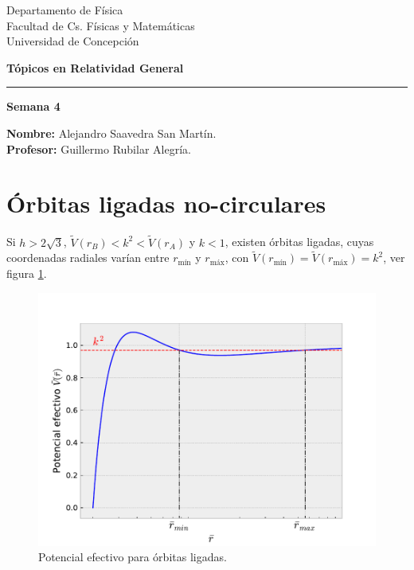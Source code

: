 \documentclass[letterpaper,11pt]{article}
\begin{document}
\pagestyle{plain}

\begin{flushleft}\vspace{-2cm}
Departamento de Física \\
Facultad de Cs. Físicas y Matemáticas\\
Universidad de Concepción
\end{flushleft}

\begin{flushright}\vspace{-1.5cm}
\textbf{Tópicos en Relatividad General} 
\end{flushright}



\rule{\linewidth}{0.1mm}

\begin{center}
\textbf{\LARGE Semana 4}
\end{center}

\begin{flushleft}
\textbf{Nombre:} Alejandro Saavedra San Martín. \\
\textbf{Profesor:} Guillermo Rubilar Alegría.
\end{flushleft}

\section*{Órbitas ligadas no-circulares}

Si $h > 2 \sqrt{3}$, $\tilde{V}(r_B) < k^2 < \tilde{V}(r_A)$ y $k < 1$, existen órbitas ligadas, cuyas coordenadas radiales varían entre $r_{\text{mín}}$ y $r_{\text{máx}}$, con $\tilde{V}(r_{\text{mín}}) = \tilde{V}(r_{\text{máx}}) = k^2$, ver figura \ref{fig:Potential}. 

\begin{figure}[H] 
    \centering
    \includegraphics[scale = 0.7]{Potencial_Efectivo_orbita-ligada}
    \caption{Potencial efectivo para órbitas ligadas.}
    \label{fig:Potential}
\end{figure}
\end{document}
